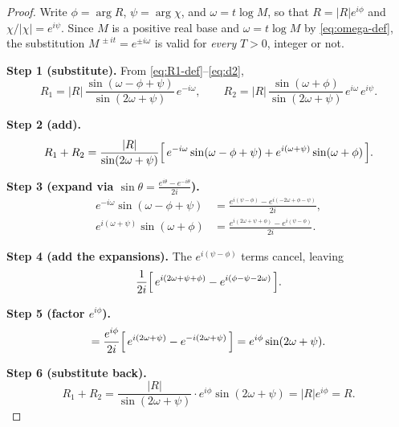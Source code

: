 \documentclass[11pt]{article}
\theoremstyle{definition}
\begin{document}
\begin{proof}
Write $\phi = \arg R$, $\psi = \arg\chi$, and $\omega=t\log M$, so that
$R=|R|e^{i\phi}$ and $\chi/|\chi|=e^{i\psi}$. Since $M$ is a
positive real base and $\omega=t\log M$ by
\eqref{eq:omega-def}, the substitution
$M^{\,\pm it}=e^{\pm i\omega}$ is valid for \emph{every}
$T>0$, integer or not.

\smallskip
\noindent\textbf{Step 1 (substitute).} From \eqref{eq:R1-def}--\eqref{eq:d2},
\[
R_{1} = |R|\,\frac{\sin(\omega - \phi + \psi)}{\sin(2\omega + \psi)}\, e^{-i\omega},
\qquad
R_{2} = |R|\,\frac{\sin(\omega + \phi)}{\sin(2\omega + \psi)}\, e^{i\omega}\, e^{i\psi}.
\]

\noindent\textbf{Step 2 (add).}
\[
R_{1} + R_{2}
= \frac{|R|}{\sin(2\omega + \psi)}
\Bigl[\, e^{-i\omega}\sin(\omega - \phi + \psi) + e^{i(\omega + \psi)}\sin(\omega + \phi)\,\Bigr].
\]

\noindent\textbf{Step 3 (expand via $\sin\theta = \tfrac{e^{i\theta}-e^{-i\theta}}{2i}$).}
\begin{align*}
e^{-i\omega}\sin(\omega - \phi + \psi)
&= \frac{e^{i(\psi - \phi)} - e^{i(-2\omega + \phi - \psi)}}{2i}, \\
e^{i(\omega + \psi)}\sin(\omega + \phi)
&= \frac{e^{i(2\omega + \psi + \phi)} - e^{i(\psi - \phi)}}{2i}.
\end{align*}

\noindent\textbf{Step 4 (add the expansions).} The $e^{i(\psi-\phi)}$ terms
cancel, leaving
\[
\frac{1}{2i}\Bigl[\, e^{i(2\omega + \psi + \phi)} - e^{i(\phi - \psi - 2\omega)}\,\Bigr].
\]

\noindent\textbf{Step 5 (factor $e^{i\phi}$).}
\[
= \frac{e^{i\phi}}{2i}\Bigl[\, e^{i(2\omega + \psi)} - e^{-i(2\omega + \psi)}\,\Bigr]
= e^{i\phi}\sin(2\omega + \psi).
\]

\noindent\textbf{Step 6 (substitute back).}
\[
R_{1} + R_{2}
= \frac{|R|}{\sin(2\omega + \psi)}\cdot e^{i\phi}\sin(2\omega + \psi)
= |R|e^{i\phi} = R.
\]


\end{proof}
\end{document}
